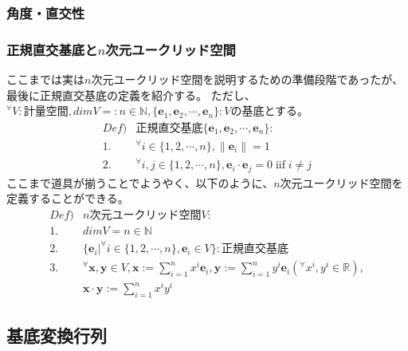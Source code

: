 \documentclass[10pt]{ujarticle}
\begin{document}
\subsubsection{角度・直交性}

\subsubsection{正規直交基底と$n$次元ユークリッド空間}
ここまでは実は$n$次元ユークリッド空間を説明するための準備段階であったが、最後に正規直交基底の定義を紹介する。
ただし、$^\forall V:\text{計量空間},dimV=:n\in\mathbb{N},\{\mathbf{e}_1,\mathbf{e}_2,\cdots,\mathbf{e}_n\}:V\text{の基底}$とする。
$$
\begin{aligned}
  Def)&\text{正規直交基底}\{\mathbf{e}_1,\mathbf{e}_2,\cdots,\mathbf{e}_n\}:\\
  1.&^\forall i\in\{1,2,\cdots,n\},\|\mathbf{e}_i\|=1\\
  2.&^\forall i,j\in\{1,2,\cdots,n\},\mathbf{e}_i\cdot\mathbf{e}_j=0\;\text{iif}\;i\neq j
\end{aligned}
$$
ここまで道具が揃うことでようやく、以下のように、$n$次元ユークリッド空間を定義することができる。
$$
\begin{aligned}
  Def)&n\text{次元ユークリッド空間}V:\\
  1.&dimV=n\in\mathbb{N}\\
  2.&\{\mathbf{e}_i|^\forall i\in\{1,2,\cdots,n\},\mathbf{e}_i\in V\}:\text{正規直交基底}\\
  3.&^\forall\mathbf{x},\mathbf{y}\in V, \mathbf{x}:=\sum_{i=1}^nx^i\mathbf{e}_i,\mathbf{y}:=\sum_{i=1}^ny^i\mathbf{e}_i(^\forall x^i,y^i\in\mathbb{R}),\\
  &\mathbf{x}\cdot\mathbf{y}:=\sum_{i=1}^nx^iy^i
\end{aligned}
$$

\subsection{基底変換行列}
\end{document}
